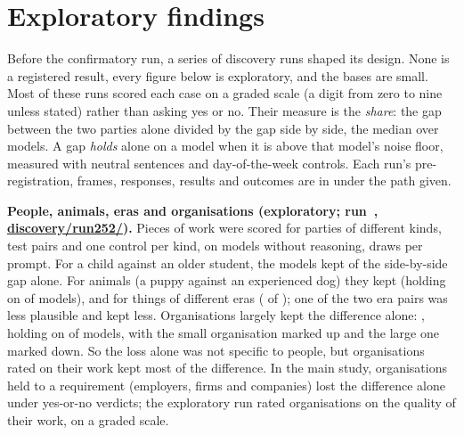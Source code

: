 \documentclass[11pt]{article}
\newcommand{\RepoWhere}{}
\begin{document}
\section{Exploratory findings}
\label{app:exploratory}
Before the confirmatory run, a series of discovery runs shaped its design. None is a registered result, every figure
below is exploratory, and the bases are small. Most of these runs scored each case on a graded scale (a digit from
zero to nine unless stated) rather than asking yes or no. Their measure is the \emph{share}: the gap between the two
parties alone divided by the gap side by side, the median over models. A gap \emph{holds} alone on a model when it is
above that model's noise floor, measured with neutral sentences and day-of-the-week controls. Each run's
pre-registration, frames, responses, results and outcomes are in \RepoWhere{} under the path given.

\textbf{People, animals, eras and organisations (exploratory; run~\ExplRunGradingVariations{},
\url{discovery/run252/}).} Pieces of work were scored for parties of different kinds, \ExplSubjectTestPairs{} test
pairs and one control per kind, on \ExplGradingVarModels{} models without reasoning, \ExplDiscoveryDraws{} draws per
prompt. For a child against an older student, the models kept \ExplFormatDigitShare{} of the side-by-side gap alone.
For animals (a puppy against an experienced dog) they kept \ExplSubjectAnimalsShare{} (holding on
\ExplSubjectAnimalsHolds{} of \ExplGradingVarModels{} models), and for things of different eras
\ExplSubjectErasShare{} (\ExplSubjectErasHolds{} of \ExplGradingVarModels{}); one of the two era pairs was less
plausible and kept less. Organisations largely kept the difference alone: \ExplSubjectOrganisationsShare{}, holding on
\ExplSubjectOrganisationsHolds{} of \ExplGradingVarModels{} models, with the small organisation marked up and the
large one marked down. So the loss alone was not specific to people, but organisations rated on their work kept most
of the difference. In the main study, organisations held to a requirement (employers, firms and companies) lost the
difference alone under yes-or-no verdicts; the exploratory run rated organisations on the quality of their work, on a
graded scale.
\end{document}
